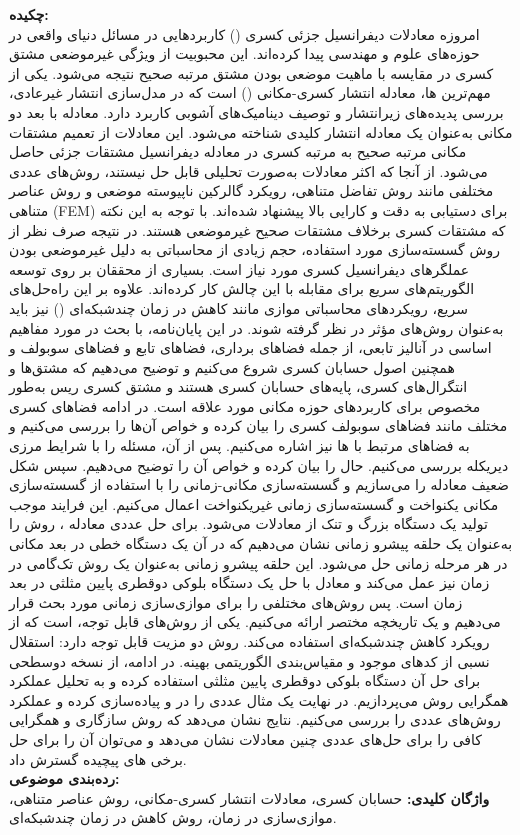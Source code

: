 \vspace*{-1cm}                   %
\thispagestyle{empty}
{\large\bf چکیده: }  
\vspace*{0.1cm}
\\
{\small
امروزه معادلات دیفرانسیل جزئی کسری
()
کاربردهایی در مسائل دنیای واقعی در حوزه‌های علوم و مهندسی پیدا کرده‌اند.
این محبوبیت از ویژگی غیرموضعی مشتق کسری در مقایسه با ماهیت موضعی بودن مشتق مرتبه صحیح نتیجه می‌شود.
یکی از مهم‌ترین
ها،
معادله انتشار کسری-مکانی
()
است که در مدل‌سازی انتشار غیرعادی، بررسی پدیده‌های زیرانتشار و توصیف دینامیک‌های آشوبی کاربرد دارد.
معادله
با بعد دو مکانی به‌عنوان یک معادله انتشار کلیدی شناخته می‌شود.
این معادلات از تعمیم مشتقات مکانی مرتبه صحیح به مرتبه کسری در معادله دیفرانسیل مشتقات جزئی حاصل می‌شود.
از آنجا که اکثر معادلات 
به‌صورت تحلیلی قابل حل نیستند، روش‌های عددی مختلفی مانند روش تفاضل متناهی، رویکرد گالرکین ناپیوسته موضعی و روش عناصر متناهی (FEM) برای دستیابی به دقت و کارایی بالا پیشنهاد شده‌اند.
با توجه به این نکته که مشتقات کسری برخلاف مشتقات صحیح غیرموضعی هستند.
در نتیجه صرف نظر از روش گسسته‌سازی مورد استفاده، حجم زیادی از محاسباتی به دلیل غیرموضعی بودن عملگرهای دیفرانسیل کسری مورد نیاز است.
بسیاری از محققان بر روی توسعه الگوریتم‌های سریع برای مقابله با این چالش کار کرده‌اند.
علاوه بر این راه‌حل‌های سریع، رویکردهای محاسباتی موازی مانند کاهش در زمان چندشبکه‌ای
()
نیز باید به‌عنوان روش‌های مؤثر در نظر گرفته شوند.
در این پایان‌نامه، با بحث در مورد مفاهیم اساسی در آنالیز تابعی، از جمله فضاهای برداری، فضاهای تابع و فضاهای سوبولف و همچنین اصول حسابان کسری شروع می‌کنیم و توضیح می‌دهیم که مشتق‌ها و انتگرال‌های کسری، پایه‌های حسابان کسری هستند و مشتق کسری ریس به‌طور مخصوص برای کاربردهای حوزه مکانی مورد علاقه است.
در ادامه فضاهای کسری مختلف مانند فضاهای سوبولف کسری را بیان کرده و خواص آن‌ها را بررسی می‌کنیم و به فضاهای مرتبط با
ها
نیز اشاره می‌کنیم.
پس از آن، مسئله
را با شرایط مرزی دیریکله بررسی می‌کنیم.
حال
را بیان کرده و خواص آن را توضیح می‌دهیم.
سپس شکل ضعیف معادله
را می‌سازیم و گسسته‌سازی مکانی-زمانی را با استفاده از گسسته‌سازی مکانی یکنواخت و گسسته‌سازی زمانی غیریکنواخت اعمال می‌کنیم.
این فرایند موجب تولید یک دستگاه بزرگ و تنک از معادلات می‌شود.
برای حل عددی معادله
،
روش را به‌عنوان یک حلقه پیشرو زمانی نشان می‌دهیم که در آن یک دستگاه خطی در بعد مکانی در هر مرحله زمانی حل می‌شود.
این حلقه پیشرو زمانی به‌عنوان یک روش تک‌گامی در زمان نیز عمل می‌کند و معادل با حل یک دستگاه بلوکی دوقطری پایین مثلثی در بعد زمان است. 
پس روش‌های مختلفی را برای موازی‌سازی زمانی مورد بحث قرار می‌دهیم و یک تاریخچه مختصر ارائه می‌کنیم.
یکی از روش‌های قابل توجه،
است که از رویکرد کاهش چندشبکه‌ای استفاده می‌کند. 
روش
دو مزیت قابل توجه دارد: استقلال نسبی از کدهای موجود و مقیاس‌بندی الگوریتمی بهینه.
در ادامه، از نسخه دوسطحی
برای حل آن دستگاه بلوکی دوقطری پایین مثلثی استفاده کرده و به تحلیل عملکرد همگرایی روش می‌پردازیم. 
در نهایت یک مثال عددی را در
\Matlab
و
\XBraid
پیاده‌سازی کرده و عملکرد روش‌های عددی را بررسی می‌کنیم.
نتایج نشان می‌دهد که روش سازگاری و همگرایی کافی را برای حل‌های عددی چنین معادلات
نشان می‌دهد و می‌توان آن را برای حل برخی 
‌های
پیچیده گسترش داد.
}
\\[.1cm]
{\bf رده‌بندی موضوعی:}
\\[0.1cm]
  {\bf
 واژگان کلیدی:
 }
حسابان کسری،‌ معادلات انتشار کسری-مکانی، روش عناصر متناهی، موازی‌سازی در زمان، روش کاهش در زمان چندشبکه‌ای.